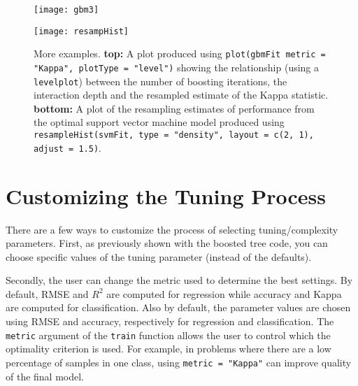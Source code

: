 \documentclass[12pt]{article}
\begin{document}
\begin{figure}[p]
   \begin{center}	
      \texttt{[image: gbm3]}    
   
      \vspace*{1 in}      
      
      \texttt{[image: resampHist]}
   
 \caption{More examples. {\bf top:} A plot produced using \texttt{plot(gbmFit metric = "Kappa", plotType = "level")} showing the relationship (using a \texttt{levelplot}) between the number of boosting iterations, the interaction depth and the resampled estimate of the Kappa statistic. {\bf bottom:} A plot of the resampling estimates of performance from the optimal support vector machine model produced using \texttt{resampleHist(svmFit, type = "density", layout = c(2, 1), adjust = 1.5)}.}   
      \label{f:plots2}         
   \end{center}
\end{figure}   

\clearpage

\section{Customizing the Tuning Process}

There are a few ways to customize the process of selecting tuning/complexity parameters. First, as previously shown with the boosted tree code, you can choose specific values of the tuning parameter (instead of the defaults).

Secondly, the user can change the metric used to determine the best settings. By default, RMSE and $R^2$ are computed for regression while accuracy and Kappa are computed for classification. Also by default, the parameter values are chosen using RMSE and accuracy, respectively  for regression and classification. The \texttt{metric} argument of the \texttt{train} function allows the user to control which the optimality criterion is used. For example, in problems where there are a low percentage of samples in one class, using \texttt{metric = "Kappa"} can improve quality of the final model.
\end{document}
